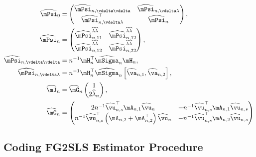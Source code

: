 \documentclass[english,12pt]{book}\usepackage[]{graphicx}\usepackage[]{xcolor}
\begin{document}
\begin{equation*}
\begin{aligned}
\widehat{\mPsi}_0 &= \begin{pmatrix}
                      \widehat{\mPsi}_{n, \vdelta\vdelta} & \widehat{\mPsi}_{n, \vdelta\lambda} \\
                      \widehat{\mPsi}_{n, \vdelta\lambda}^\top & \widehat{\mPsi}_n
                     \end{pmatrix},  \\
\widehat{\mPsi}_{n} & = \begin{pmatrix}
                         \widehat{\mPsi}^{\widehat{\lambda}\widehat{\lambda}}_{n, 11} &  \widehat{\mPsi}^{\widehat{\lambda}\widehat{\lambda}}_{n, 12} \\
                         \widehat{\mPsi}^{\widehat{\lambda}\widehat{\lambda}}_{n, 12} & \widehat{\mPsi}^{\widehat{\lambda}\widehat{\lambda}}_{n, 22}
                         \end{pmatrix}, \\
\widehat{\mPsi}_{n, \vdelta\vdelta} & = n^{-1}\mH_n^\top\widehat{\mSigma}_n\mH_n, \\           \widehat{\mPsi}_{n, \vdelta\lambda} & = n^{-1}\mH_n^\top\widehat{\mSigma}_n\left[\widehat{\va}_{n,1}, \widehat{\va}_{n,2}\right],\\
\widehat{\mJ}_n & = \widehat{\mG}_n\begin{pmatrix}
                                    1 \\
                                    2 \widehat{\lambda}_n
                                  \end{pmatrix}, \\
  \widehat{\mG}_n & = \begin{pmatrix}
                        2n^{-1}\widehat{\vu}_{n, s}^\top \mA_{n, 1}\widehat{\vu}_n & -n^{-1}\widehat{\vu}_{n, s}^\top\mA_{n, 1}\widehat{\vu}_{n, s} \\
                        n^{-1}\widehat{\vu}_{n, s}^\top\left(\mA_{n, 2} + \mA_{n, 2}^\top\right)\widehat{\vu}_n & - n^{-1}\widehat{\vu}_{n, s}^\top\mA_{n, 2}\widehat{\vu}_{n, s}
                      \end{pmatrix}
  \end{aligned} 
\end{equation*}
\subsection{Coding FG2SLS Estimator Procedure}
\end{document}

